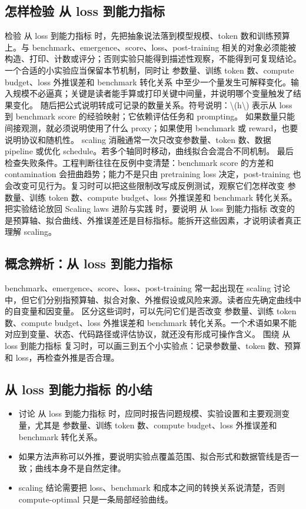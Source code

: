 \documentclass[a4paper]{article}
\begin{document}
\subsection{怎样检验 从 loss 到能力指标}
检验 从 loss 到能力指标 时，先把抽象说法落到模型规模、token 数和训练预算上。与 benchmark、emergence、score、loss、post-training 相关的对象必须能被构造、打印、计数或评分；否则实验只能得到描述性观察，不能得到可复现结论。
一个合适的小实验应当保留本节机制，同时让 参数量、训练 token 数、compute budget、loss 外推误差和 benchmark 转化关系 中至少一个量发生可解释变化。输入规模不必逼真；关键是读者能手算或打印关键中间量，并说明哪个变量触发了结果变化。
随后把公式说明转成可记录的数量关系。符号说明：\textbackslash{}(h\textbackslash{}) 表示从 loss 到 benchmark score 的经验映射；它依赖评估任务和 prompting。 如果数量只能间接观测，就必须说明使用了什么 proxy；如果使用 benchmark 或 reward，也要说明协议和随机性。
scaling 消融通常一次只改变参数量、token 数、数据 pipeline 或优化 schedule。若多个轴同时移动，曲线拟合会混合不同机制。
最后检查失败条件。工程判断往往在反例中变清楚：benchmark score 的方差和 contamination 会扭曲趋势；能力不是只由 pretraining loss 决定，post-training 也会改变可见行为。复习时可以把这些限制改写成反例测试，观察它们怎样改变 参数量、训练 token 数、compute budget、loss 外推误差和 benchmark 转化关系。
把实验结论放回 Scaling laws 进阶与实践 时，要说明 从 loss 到能力指标 改变的是预算轴、拟合曲线、外推误差还是目标指标。能拆开这些因素，才说明读者真正理解 scaling。
\subsection{概念辨析：从 loss 到能力指标}
benchmark、emergence、score、loss、post-training 常一起出现在 scaling 讨论中，但它们分别指预算轴、拟合对象、外推假设或风险来源。读者应先确定曲线中的自变量和因变量。
区分这些词时，可以先问它们是否改变 参数量、训练 token 数、compute budget、loss 外推误差和 benchmark 转化关系。一个术语如果不能对应到变量、状态、代码路径或评估协议，就还没有形成可操作含义。
围绕 从 loss 到能力指标 复习时，可以画三到五个小实验点：记录参数量、token 数、预算和 loss，再检查外推是否合理。
\subsection{从 loss 到能力指标 的小结}
\begin{itemize}
\item 讨论 从 loss 到能力指标 时，应同时报告问题规模、实验设置和主要观测变量，尤其是 参数量、训练 token 数、compute budget、loss 外推误差和 benchmark 转化关系。
\item 如果方法声称可以外推，要说明实验点覆盖范围、拟合形式和数据管线是否一致；曲线本身不是自然定律。
\item scaling 结论需要把 loss、benchmark 和成本之间的转换关系说清楚，否则 compute-optimal 只是一条局部经验曲线。
\end{itemize}
\end{document}
